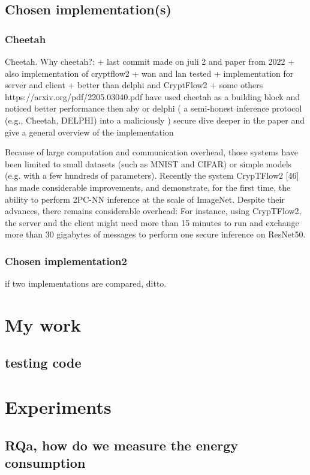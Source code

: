 \documentclass[twoside]{Style/uva-inf-bachelor-thesis}
\begin{document}
\section{Chosen implementation(s)}
\subsection{Cheetah}
Cheetah. Why cheetah?:
+ last commit made on juli 2 and paper from 2022
+ also implementation of cryptflow2
+ wan and lan tested
+ implementation for server and client
+ better than delphi and CryptFlow2	 
+ some others https://arxiv.org/pdf/2205.03040.pdf have used cheetah as a building block and noticed better performance then aby or delphi ( a semi-honest inference protocol (e.g., Cheetah, DELPHI) into a maliciously ) secure
dive deeper in the paper and give a general overview of the implementation

Because of large computation and communication overhead, those systems have been limited to small datasets (such as MNIST and CIFAR) or simple models (e.g. with a few hundreds of parameters). Recently the system CrypTFlow2 [46] has made considerable improvements, and demonstrate, for the first time, the ability to perform 2PC-NN inference at the scale of ImageNet. Despite their advances, there remains considerable overhead: For instance, using CrypTFlow2, the server and the client might need more than 15 minutes to run and exchange more than 30 gigabytes of messages to perform
one secure inference on ResNet50.
\subsection{Chosen implementation2}
if two implementations are compared, ditto.

\chapter{My work}
\section{testing code}

\chapter{Experiments}
\section{RQa, how do we measure the energy consumption}
\end{document}
